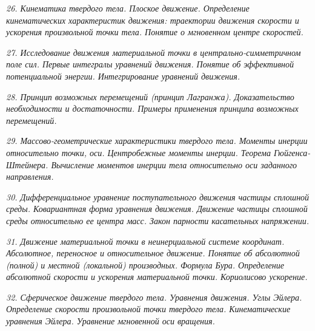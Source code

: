 \newpage %

\emph{26. Кинематика твердого тела. Плоское движение. Определение кинематических
характеристик движения: траектории движения скорости и ускорения
произвольной точки тела. Понятие о мгновенном центре скоростей.}

\newpage %

\emph{27. Исследование движения материальной точки в центрально-симметричном
поле сил. Первые интегралы уравнений движения. Понятие об эффективной
потенциальной энергии. Интегрирование уравнений движения.}

\newpage %

\emph{28. Принцип возможных перемещений (принцип Лагранжа). Доказательство
необходимости и достаточности. Примеры применения принципа возможных
перемещений.}

\newpage %

\emph{29. Массово-геометрические характеристики твердого тела. Моменты инерции
относительно точки, оси. Центробежные моменты инерции. Теорема
Гюйгенса-Штейнера. Вычисление моментов инерции тела относительно оси
заданного направления.}

\newpage %

\emph{30. Дифференциальное уравнение поступательного движения частицы сплошной
среды. Ковариантная форма уравнения движения. Движение частицы сплошной
среды относительно ее центра масс. Закон парности касательных напряжении.}

\newpage %

\emph{31. Движение материальной точки в неинерциальной системе координат.
Абсолютное, переносное и относительное движение. Понятие об абсолютной
(полной) и местной (локальной) производных. Формула Бура. Определение
абсолютной скорости и ускорения материальной точки. Кориолисово ускорение.}

\newpage %

\emph{32. Сферическое движение твердого тела. Уравнения движения. Углы Эйлера.
Определение скорости произвольной точки твердого тела. Кинематические
уравнения Эйлера. Уравнение мгновенной оси вращения.}


